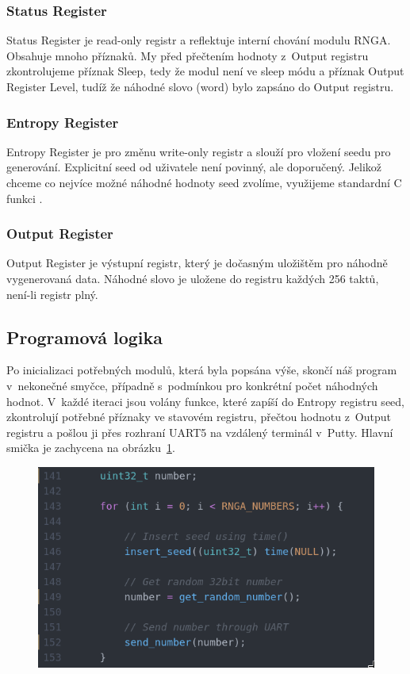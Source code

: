 \documentclass[11pt, a4paper, titlepage]{article}
\begin{document}
\subsubsection{Status Register}

Status Register je read-only registr a reflektuje interní chování modulu RNGA. Obsahuje mnoho příznaků. My před přečtením hodnoty z~Output registru zkontrolujeme příznak Sleep, tedy že modul není ve sleep módu a příznak Output Register Level, tudíž že náhodné slovo (word) bylo zapsáno do Output registru.


\subsubsection{Entropy Register}

Entropy Register je pro změnu write-only registr a slouží pro vložení seedu pro generování. Explicitní seed od uživatele není povinný, ale doporučený. Jelikož chceme co nejvíce možné náhodné hodnoty seed zvolíme, využijeme standardní C funkci . \cite{TIME}


\subsubsection{Output Register}

Output Register je výstupní registr, který je dočasným uložištěm pro náhodně vygenerovaná data. Náhodné slovo je uložene do registru každých 256 taktů, není-li registr plný.


\subsection{Programová logika}

Po inicializaci potřebných modulů, která byla popsána výše, skončí náš program v~nekonečné smyčce, případně s~podmínkou pro konkrétní počet náhodných hodnot. V~každé iteraci jsou volány funkce, které zapíší do Entropy registru seed, zkontrolují potřebné příznaky ve stavovém registru, přečtou hodnotu z~Output registru a pošlou ji přes rozhraní UART5 na vzdálený terminál v~Putty. Hlavní smička je zachycena na obrázku~\ref{fig:source_code}.

\begin{figure}[H]
    \centering
    \includegraphics[width=.65\textwidth]{images/source_code.png}
    \label{fig:source_code}
\end{figure}
\end{document}
